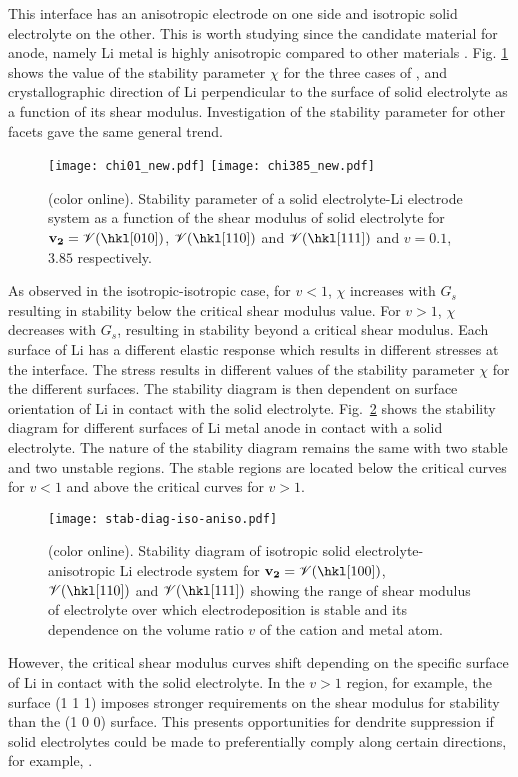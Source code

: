\documentclass[%
reprint,
 amsmath,amssymb,
 aps,
 prb,
]{revtex4-1}
\newcommand*{\rtvec}[1]{\mathbf{#1}}
\begin{document}
This interface has an anisotropic electrode on one side and isotropic solid electrolyte on the other. This is worth studying since the candidate material for anode, namely Li metal is highly anisotropic compared to other materials \cite{xuLi2017}. Fig. \ref{fig:chi} shows the value of the stability parameter $\chi$ for the three cases of \hkl[1 0 0], \hkl[1 1 0] and \hkl[1 1 1] crystallographic direction of Li perpendicular to the surface of solid electrolyte as a function of its shear modulus.  Investigation of the stability parameter for other facets gave the same general trend.
\begin{figure}[htbp]
\texttt{[image: chi01\_new.pdf]}
\texttt{[image: chi385\_new.pdf]}
\caption{\label{fig:chi} (color online). Stability parameter of a solid electrolyte-Li electrode system as a function of the shear modulus of solid electrolyte for $\rtvec{v_2}=\mathscr{V}(\hkl[0 1 0])$, $\mathscr{V}(\hkl[1 1 0])$ and $\mathscr{V}(\hkl[1 1 1])$ and $v=0.1$, $3.85$ respectively.}
\end{figure}
As observed in the isotropic-isotropic case, for $v<1$, $\chi$ increases with $G_s$ resulting in stability below the critical shear modulus value. For $v>1$, $\chi$ decreases with $G_s$, resulting in stability beyond a critical shear modulus. Each surface of Li has a different elastic response which results in different stresses at the interface. The stress results in different values of the stability parameter $\chi$ for the different surfaces. The stability diagram is then dependent on surface orientation of Li in contact with the solid electrolyte. Fig.~\ref{fig:stab-diag-anis} shows the stability diagram for different surfaces of Li metal anode in contact with a solid electrolyte. The nature of the stability diagram remains the same with two stable and two unstable regions. The stable regions are located below the critical curves for $v<1$ and above the critical curves for $v>1$.
\begin{figure}
{\texttt{[image: stab-diag-iso-aniso.pdf]}}
\caption{\label{fig:stab-diag-anis} (color online). Stability diagram of isotropic solid electrolyte-anisotropic Li electrode system for $\rtvec{v_2}=\mathscr{V}(\hkl[100])$, $\mathscr{V}(\hkl[110])$ and $\mathscr{V}(\hkl[111])$ showing the range of shear modulus of electrolyte over which electrodeposition is stable and its dependence on the volume ratio $v$ of the cation and metal atom.}
\end{figure}
However, the critical shear modulus curves shift depending on the specific surface of Li in contact with the solid electrolyte. In the $v>1$ region, for example, the surface \hkl(1 1 1) imposes stronger requirements on the shear modulus for stability than the \hkl(1 0 0) surface.  This presents opportunities for dendrite suppression if solid electrolytes could be made to preferentially comply along certain directions, for example, \hkl[1 1 1].
\end{document}
